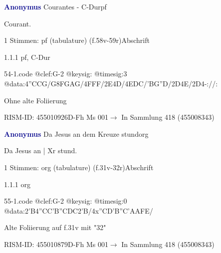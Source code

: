 \documentclass[twocolumn]{book}
\begin{document}
\par \vspace{7pt} \textcolor{darkblue}{\textbf{Anonymus  }}\hfillplus{\textbf{[54]}}\newline Courantes - C-Dur\newline pf
\par \begin{itshape}[f.58v, at left:] Courant.\end{itshape} 
\par \textcolor{darkblue}{}  1 Stimmen: pf (tabulature)  (f.58v-59r)\newline Abschrift
\par 1.1.1  pf, C-Dur  
\begin{filecontents*}{54-1.code}
@clef:G-2
@keysig:
@timesig:3
@data:4''CCG/G{8FGAG}/4FFF/2E4D/4EDC/'BG''D/2D4E/2D4-://:
\end{filecontents*}
\newline
%
\par Ohne alte Foliierung
\par RISM-ID: 455010926\newline D-Fh  Ms 001\newline $\rightarrow$ In Sammlung 418 (455008343)
      
\par \vspace{7pt} \textcolor{darkblue}{\textbf{Anonymus  }}\hfillplus{\textbf{[55]}}\newline Da Jesus an dem Kreuze stund\newline org
\par \begin{itshape}[f.31v, at left:] Da Jesus an | Xr stund.\end{itshape} 
\par \textcolor{darkblue}{}  1 Stimmen: org (tabulature)  (f.31v-32r)\newline Abschrift
\par 1.1.1  org  
\begin{filecontents*}{55-1.code}
@clef:G-2
@keysig:
@timesig:0
@data:2'B4''CC'B''CDC2'B/4x''CD'B''C'AAFE/
\end{filecontents*}
\newline
%
\par Alte Foliierung auf f.31v mit "32"
\par RISM-ID: 455010879\newline D-Fh  Ms 001\newline $\rightarrow$ In Sammlung 418 (455008343)
      
\end{document}
